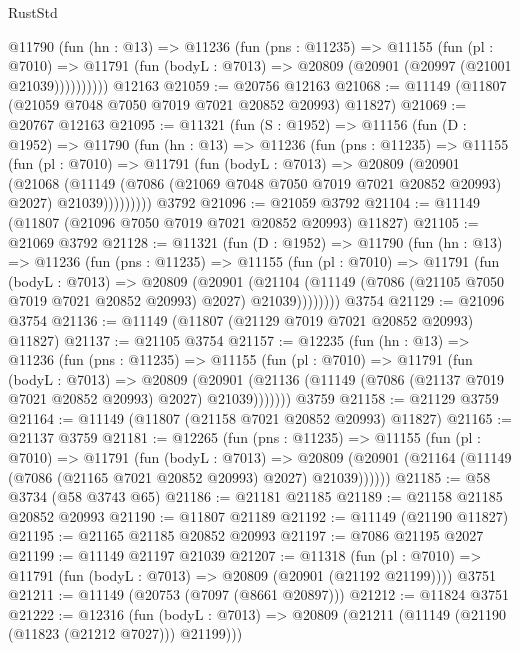 \begin{lexlean}{RustStd}
\begin{coremodule}
        @11790
          (fun (hn : @13) =>
          @11236
            (fun (pns : @11235) =>
            @11155
              (fun (pl : @7010) =>
              @11791 (fun (bodyL : @7013) => @20809 (@20901 (@20997 (@21001 @21039))))))))))
    @12163
@21059 := @20756 @12163
@21068 := @11149 (@11807 (@21059 @7048 @7050 @7019 @7021 @20852 @20993) @11827)
@21069 := @20767 @12163
@21095 := @11321
    (fun (S : @1952) =>
    @11156
      (fun (D : @1952) =>
      @11790
        (fun (hn : @13) =>
        @11236
          (fun (pns : @11235) =>
          @11155
            (fun (pl : @7010) =>
            @11791
              (fun (bodyL : @7013) =>
              @20809
                (@20901
                  (@21068
                    (@11149
                      (@7086 (@21069 @7048 @7050 @7019 @7021 @20852 @20993) @2027)
                      @21039)))))))))
    @3792
@21096 := @21059 @3792
@21104 := @11149 (@11807 (@21096 @7050 @7019 @7021 @20852 @20993) @11827)
@21105 := @21069 @3792
@21128 := @11321
    (fun (D : @1952) =>
    @11790
      (fun (hn : @13) =>
      @11236
        (fun (pns : @11235) =>
        @11155
          (fun (pl : @7010) =>
          @11791
            (fun (bodyL : @7013) =>
            @20809
              (@20901
                (@21104
                  (@11149 (@7086 (@21105 @7050 @7019 @7021 @20852 @20993) @2027) @21039))))))))
    @3754
@21129 := @21096 @3754
@21136 := @11149 (@11807 (@21129 @7019 @7021 @20852 @20993) @11827)
@21137 := @21105 @3754
@21157 := @12235
    (fun (hn : @13) =>
    @11236
      (fun (pns : @11235) =>
      @11155
        (fun (pl : @7010) =>
        @11791
          (fun (bodyL : @7013) =>
          @20809
            (@20901 (@21136 (@11149 (@7086 (@21137 @7019 @7021 @20852 @20993) @2027) @21039)))))))
    @3759
@21158 := @21129 @3759
@21164 := @11149 (@11807 (@21158 @7021 @20852 @20993) @11827)
@21165 := @21137 @3759
@21181 := @12265
    (fun (pns : @11235) =>
    @11155
      (fun (pl : @7010) =>
      @11791
        (fun (bodyL : @7013) =>
        @20809 (@20901 (@21164 (@11149 (@7086 (@21165 @7021 @20852 @20993) @2027) @21039))))))
@21185 := @58 @3734 (@58 @3743 @65)
@21186 := @21181 @21185
@21189 := @21158 @21185 @20852 @20993
@21190 := @11807 @21189
@21192 := @11149 (@21190 @11827)
@21195 := @21165 @21185 @20852 @20993
@21197 := @7086 @21195 @2027
@21199 := @11149 @21197 @21039
@21207 := @11318
    (fun (pl : @7010) => @11791 (fun (bodyL : @7013) => @20809 (@20901 (@21192 @21199))))
    @3751
@21211 := @11149 (@20753 (@7097 (@8661 @20897)))
@21212 := @11824 @3751
@21222 := @12316
    (fun (bodyL : @7013) => @20809 (@21211 (@11149 (@21190 (@11823 (@21212 @7027))) @21199)))

\end{coremodule}
\end{lexlean}
